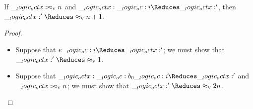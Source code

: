 \begin{theorem}[Adequacy]
  If \(\__logic_octx: \approx\sb{\text{\normalfont\scshape v}} n\) and \(\octx \oc i \Reduces \octx'\), then \(\octx' \Reduces \aval{}{n+1}\).
\end{theorem}
\begin{proof}
  \begin{itemize}
  \item Suppose that \(e \oc i \Reduces \octx'\); we must show that \(\octx' \Reduces \aval{}{1}\).
  \item Suppose that \(\octx \oc b_0 \oc i \Reduces \octx'\) and \(\__logic_octx: \approx\sb{\text{\normalfont\scshape v}} n\); we must show that \(\octx' \Reduces \aval{}{2n}\).
  \end{itemize}
\end{proof}



